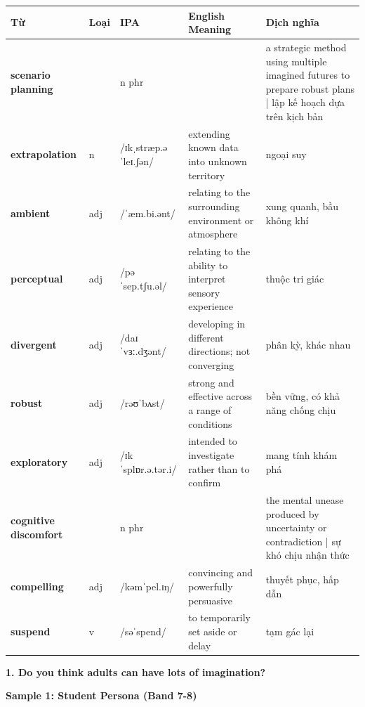 \vspace{0.8em}
\begin{center}
\renewcommand{\arraystretch}{1.65}
\begin{tabularx}{\textwidth}{|V{0.22\textwidth}|C{0.07\textwidth}|I{0.20\textwidth}|Y|V{0.18\textwidth}|}
\hline
{}
\textbf{Từ} & \textbf{Loại} & \textbf{IPA} & \textbf{English Meaning} & \textbf{Dịch nghĩa} \\
\hline
\textbf{scenario planning} & & n phr & & a strategic method using multiple imagined futures to prepare robust plans | lập kế hoạch dựa trên kịch bản \\ \hline
\textbf{extrapolation} & n & /ɪkˌstræp.əˈleɪ.ʃən/ & extending known data into unknown territory & ngoại suy \\ \hline
\textbf{ambient} & adj & /ˈæm.bi.ənt/ & relating to the surrounding environment or atmosphere & xung quanh, bầu không khí \\ \hline
\textbf{perceptual} & adj & /pəˈsep.tʃu.əl/ & relating to the ability to interpret sensory experience & thuộc tri giác \\ \hline
\textbf{divergent} & adj & /daɪˈvɜː.dʒənt/ & developing in different directions; not converging & phân kỳ, khác nhau \\ \hline
\textbf{robust} & adj & /rəʊˈbʌst/ & strong and effective across a range of conditions & bền vững, có khả năng chống chịu \\ \hline
\textbf{exploratory} & adj & /ɪkˈsplɒr.ə.tər.i/ & intended to investigate rather than to confirm & mang tính khám phá \\ \hline
\textbf{cognitive discomfort} & & n phr & & the mental unease produced by uncertainty or contradiction | sự khó chịu nhận thức \\ \hline
\textbf{compelling} & adj & /kəmˈpel.ɪŋ/ & convincing and powerfully persuasive & thuyết phục, hấp dẫn \\ \hline
\textbf{suspend} & v & /səˈspend/ & to temporarily set aside or delay & tạm gác lại \\ \hline
\end{tabularx}
\end{center}

\partthreeheader

\begin{ieltsquestion}
\textbf{1. Do you think adults can have lots of imagination?}
\end{ieltsquestion}
\textbf{Sample 1: Student Persona (Band 7-8)}

